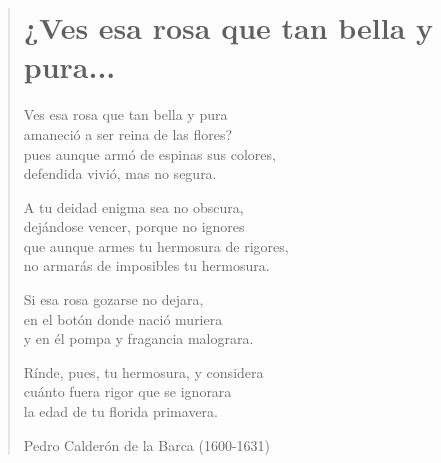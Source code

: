\documentclass[12pt, twoside]{book}
\begin{document}
\newpage
\begin{verse}
\begin{center}
\section{¿Ves esa rosa que tan bella y pura...}
\end{center}
Ves esa rosa que tan bella y pura\\
amaneció a ser reina de las flores?\\
pues aunque armó de espinas sus colores,\\
defendida vivió, mas no segura.
\newline

A tu deidad enigma sea no obscura,\\
dejándose vencer, porque no ignores\\
que aunque armes tu hermosura de rigores,\\
no armarás de imposibles tu hermosura.
\newline

Si esa rosa gozarse no dejara,\\
en el botón donde nació muriera\\
y en él pompa y fragancia malograra.
\newline

Rínde, pues, tu hermosura, y considera\\
cuánto fuera rigor que se ignorara\\
la edad de tu florida primavera.
\newline

Pedro Calderón de la Barca (1600-1631)
\end{verse}
\end{document}
